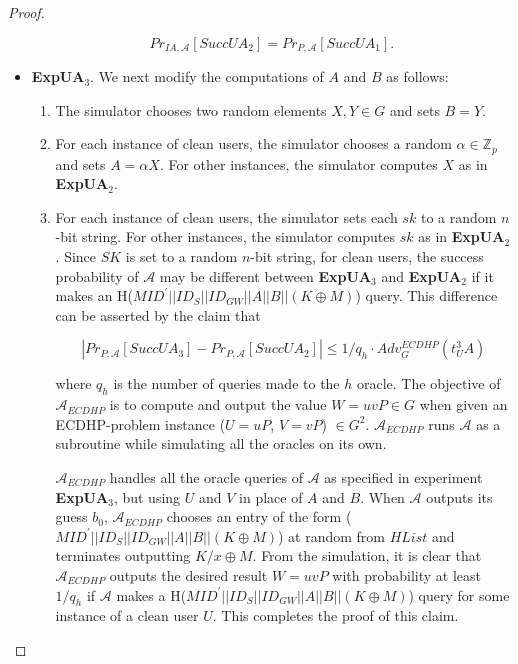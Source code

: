 \documentclass[a4paper,12pt]{report}
\begin{document}
\begin{proof}
\begin{itemize}
\begin{equation}\label{E2}
Pr_{IA, \mathcal{A}}[SuccUA_2] = Pr_{P, \mathcal{A}}[SuccUA_1].
\end{equation}

\item \textbf{ExpUA$_3$}. We next modify the computations of $A$ and $B$ as follows:

\begin{enumerate}
\item The simulator chooses two random elements $X, Y \in G$ and sets $B = Y$.

\item For each instance of clean users, the simulator chooses a random
$\alpha \in \mathbb{Z}_p$ and sets $A = \alpha X$. For other
instances, the simulator computes $X$ as in \textbf{ExpUA$_2$}.

\item  For each instance of clean users, the simulator sets each
$sk$ to a random $n$-bit string. For other instances, the simulator
computes $sk$ as in \textbf{ExpUA$_2$}. Since $SK$ is set to a
random $n$-bit string, for clean users, the success probability of
$\mathcal{A}$ may be different between \textbf{ExpUA$_3$} and
\textbf{ExpUA$_2$} if it makes an
H($MID^{\prime}||ID_S||ID_{GW}||A||B||(K \oplus M)$) query. This
difference can be asserted by the claim that

\begin{equation}\label{E3}
|Pr_{P, \mathcal{A}}[SuccUA_3] - Pr_{P, \mathcal{A}}[SuccUA_2]|\leq
1/q_h \cdot Adv^{ECDHP}_G (t^3_UA)
\end{equation}

\noindent where $q_h$ is the number of queries made to the $h$
oracle. The objective of $\mathcal{A}_{ECDHP}$ is to compute and
output the value $W = uvP \in G$ when given an ECDHP-problem
instance ($U = uP$, $V = vP$) $\in G^2$. $\mathcal{A}_{ECDHP}$ runs
$\mathcal{A}$ as a subroutine while simulating all the oracles on
its own.

$\mathcal{A}_{ECDHP}$ handles all the oracle queries of
$\mathcal{A}$ as specified in experiment \textbf{ExpUA$_3$}, but
using $U$ and $V$ in place of $A$ and $B$. When $\mathcal{A}$
outputs its guess $b_0$, $\mathcal{A}_{ECDHP}$ chooses an entry of
the form ($MID^{\prime}||ID_S||ID_{GW}||A||B||(K \oplus M)$) at
random from $HList$ and terminates outputting $K/x \oplus M$. From
the simulation, it is clear that $\mathcal{A}_{ECDHP}$ outputs the
desired result $W = uvP$ with probability at least $1/q_h$ if
$\mathcal{A}$ makes a H($MID^{\prime}||ID_S||ID_{GW}||A||B||(K
\oplus M)$) query for some instance of a clean user $U$. This
completes the proof of this claim.


\end{enumerate}
\end{itemize}
\end{proof}
\end{document}

